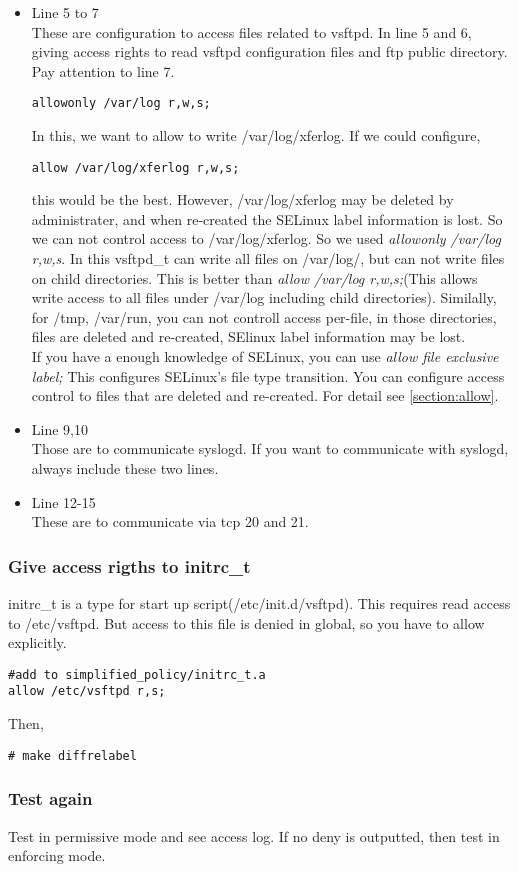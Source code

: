 \begin{itemize}
 \item Line 5 to 7\\
       These are configuration to access files related to vsftpd. In line 5 and
       6, giving access rights to read vsftpd configuration files and
       ftp public directory. \\
       Pay attention to line 7.
       \begin{verbatim}
allowonly /var/log r,w,s;
       \end{verbatim}
       In this, we want to allow to write /var/log/xferlog. If we could
       configure,
\begin{verbatim}
allow /var/log/xferlog r,w,s;
\end{verbatim}
       this would be the best. However, /var/log/xferlog may be
       deleted by administrater, and when re-created the SELinux label
       information is lost. So we can not control access to
       /var/log/xferlog. 
       So we used {\it allowonly /var/log r,w,s}. In this vsftpd\_t can write
       all files on /var/log/, but can not write files on child
       directories. This is better than {\it allow /var/log r,w,s;}(This
       allows write access to all files under /var/log including child directories).
       Similally, for /tmp, /var/run, you can not controll access
       per-file, in those directories, files are deleted and re-created,
       SElinux label information may be lost.\\
       If you have a enough knowledge of SELinux, you can use {\it allow
       file exclusive label;} This configures SELinux's file type
       transition. You can configure access control to files that are
       deleted and re-created. For detail see \ref{section:allow}.\\

 \item Line 9,10\\
       Those are to communicate syslogd. If you want to communicate with
       syslogd, always include these two lines.
       
 \item Line 12-15\\
       These are to communicate via tcp 20 and 21.
\end{itemize}

\subsubsection{Give access rigths to initrc\_t}
initrc\_t is a type for start up script(/etc/init.d/vsftpd). 
This requires read access to /etc/vsftpd. But access to this file is
denied in global, so you have to allow explicitly.
\begin{verbatim}
#add to simplified_policy/initrc_t.a
allow /etc/vsftpd r,s;
\end{verbatim}
Then, 
\begin{verbatim}
# make diffrelabel
\end{verbatim}

\subsubsection{Test again}
Test in permissive mode and see access log. 
If no deny is outputted, then test in enforcing mode.


